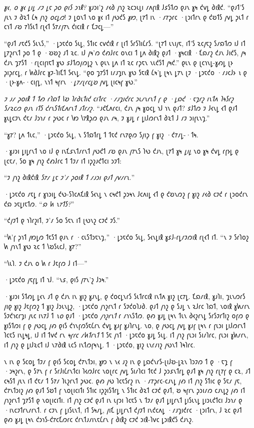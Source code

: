 \emph{𐑣𐑬, 𐑴 𐑣𐑬 𐑛𐑦𐑛 𐑥𐑲 𐑛𐑱 𐑜𐑴 𐑞𐑦𐑕 𐑮𐑪𐑙?} 𐑣𐑨𐑮𐑦'𐑟 𐑥𐑬𐑔 𐑢𐑪𐑟 𐑷𐑤𐑮𐑧𐑛𐑦 𐑥𐑵𐑝𐑦𐑙 𐑓𐑭𐑕𐑑𐑼 𐑞𐑨𐑯 𐑣𐑰 𐑒𐑫𐑛 𐑔𐑦𐑙𐑒. “𐑞𐑨𐑑'𐑕 𐑢𐑧𐑯 𐑲 𐑔𐑷𐑑 𐑖𐑰 𐑢𐑪𐑟 \emph{𐑴𐑤𐑛𐑼}! 𐑲 𐑛𐑴𐑯𐑑 𐑯𐑴 𐑣𐑬 𐑦𐑑 𐑢𐑻𐑒𐑕 \emph{𐑣𐑽}, 𐑚𐑳𐑑 𐑦𐑯 ·𐑥𐑳𐑜𐑩𐑤 ·𐑚𐑮𐑦𐑑𐑩𐑯 𐑞 𐑒𐑹𐑑𐑕 𐑢𐑫𐑛 𐑜𐑧𐑑 𐑩 𐑤𐑪𐑑 𐑥𐑹 𐑳𐑐𐑕𐑧𐑑 𐑩𐑚𐑬𐑑 𐑕𐑳𐑥𐑢𐑳𐑯 𐑒𐑦𐑤𐑦𐑙 𐑩 𐑗𐑲𐑤𐑛—”

“𐑞𐑨𐑑 𐑥𐑱𐑒𐑕 𐑕𐑧𐑯𐑕,” ·𐑛𐑮𐑱𐑒𐑴 𐑕𐑧𐑛, 𐑕𐑑𐑦𐑤 𐑤𐑫𐑒𐑦𐑙 𐑩 𐑚𐑦𐑑 𐑕𐑩𐑕𐑐𐑦𐑖𐑩𐑕. “𐑚𐑳𐑑 𐑧𐑯𐑦𐑢𐑱, 𐑦𐑑'𐑕 𐑷𐑤𐑢𐑱𐑟 𐑕𐑥𐑸𐑑𐑼 𐑦𐑓 𐑦𐑑 𐑛𐑳𐑟𐑩𐑯𐑑 𐑜𐑴 𐑑 𐑞 ·𐑹𐑹𐑟 𐑨𐑑 𐑷𐑤. 𐑦𐑓 𐑢𐑰'𐑼 𐑒𐑺𐑓𐑩𐑤 𐑴𐑯𐑤𐑦 𐑑 𐑛𐑵 𐑔𐑦𐑙𐑟 𐑞𐑨𐑑 ·𐑣𐑰𐑤𐑦𐑙 ·𐑗𐑸𐑥𐑟 𐑒𐑨𐑯 𐑓𐑦𐑒𐑕, 𐑢𐑰 𐑒𐑨𐑯 𐑡𐑳𐑕𐑑 ·𐑩𐑚𐑤𐑦𐑝𐑦𐑱𐑑 𐑣𐑻 𐑭𐑓𐑑𐑼𐑢𐑼𐑛𐑟 𐑯 𐑞𐑧𐑯 𐑛𐑵 𐑦𐑑 𐑷𐑤 𐑩𐑜𐑱𐑯 𐑯𐑧𐑒𐑕𐑑 𐑢𐑰𐑒.” 𐑞𐑧𐑯 𐑞 𐑚𐑤𐑪𐑯𐑛-𐑣𐑺𐑛 𐑚𐑶 𐑜𐑦𐑜𐑩𐑤𐑛, 𐑩 𐑿𐑔𐑓𐑩𐑤 𐑣𐑲-𐑐𐑦𐑗𐑑 𐑕𐑬𐑯𐑛. “𐑞𐑴 𐑡𐑳𐑕𐑑 𐑦𐑥𐑨𐑡𐑦𐑯 𐑣𐑻 𐑕𐑱𐑦𐑙 𐑖𐑰'𐑛 𐑚𐑰𐑯 𐑛𐑳𐑯 𐑚𐑲 ·𐑛𐑮𐑱𐑒𐑴 ·𐑥𐑨𐑤𐑓𐑶 \emph{𐑯} 𐑞 ·𐑚𐑶-𐑣𐑵-·𐑤𐑦𐑝𐑛, 𐑯𐑪𐑑 𐑰𐑝𐑩𐑯 \emph{·𐑛𐑳𐑥𐑚𐑩𐑤𐑛𐑹} 𐑢𐑫𐑛 𐑚𐑦𐑤𐑰𐑝 𐑣𐑻.”

\emph{𐑲 𐑨𐑥 𐑜𐑴𐑦𐑙 𐑑 𐑑𐑺 𐑩𐑐𐑸𐑑 𐑘𐑹 𐑐𐑩𐑔𐑧𐑑𐑦𐑒 𐑤𐑦𐑑𐑩𐑤 ·𐑥𐑨𐑡𐑦𐑒𐑩𐑤 𐑮𐑧𐑥𐑯𐑩𐑯𐑑 𐑝 𐑞 ·𐑛𐑸𐑒 ·𐑱𐑡𐑩𐑟 𐑦𐑯𐑑𐑵 𐑐𐑰𐑕𐑩𐑟 𐑕𐑥𐑷𐑤𐑼 𐑞𐑨𐑯 𐑦𐑑𐑕 𐑒𐑩𐑯𐑕𐑑𐑦𐑗𐑵𐑩𐑯𐑑 𐑨𐑑𐑩𐑥𐑟.} “𐑨𐑒𐑗𐑵𐑩𐑤𐑦, 𐑒𐑨𐑯 𐑢𐑰 𐑣𐑴𐑤𐑛 𐑪𐑓 𐑪𐑯 𐑞𐑨𐑑? 𐑭𐑓𐑑𐑼 𐑲 𐑓𐑬𐑯𐑛 𐑬𐑑 𐑞𐑨𐑑 𐑣𐑧𐑛𐑤𐑲𐑯 𐑒𐑱𐑥 𐑓𐑮𐑪𐑥 𐑩 𐑜𐑻𐑤 𐑩 𐑘𐑽 𐑘𐑳𐑙𐑜𐑼 𐑞𐑨𐑯 𐑥𐑰, 𐑲 𐑣𐑨𐑛 𐑩 𐑛𐑦𐑓𐑼𐑩𐑯𐑑 𐑔𐑷𐑑 𐑓 𐑥𐑲 𐑮𐑦𐑝𐑧𐑯𐑡.”

“𐑣𐑳? 𐑛𐑵 𐑑𐑧𐑤,” ·𐑛𐑮𐑱𐑒𐑴 𐑕𐑧𐑛, 𐑯 𐑕𐑑𐑸𐑑𐑩𐑛 𐑑 𐑑𐑱𐑒 𐑩𐑯𐑳𐑞𐑼 𐑕𐑢𐑦𐑜 𐑝 𐑣𐑦𐑟 ·𐑒𐑳𐑥𐑛-·𐑑𐑰.

·𐑣𐑨𐑮𐑦 𐑛𐑦𐑛𐑩𐑯𐑑 𐑯𐑴 𐑦𐑓 𐑞 𐑦𐑯𐑗𐑭𐑯𐑑𐑥𐑩𐑯𐑑 𐑢𐑻𐑒𐑑 𐑥𐑹 𐑞𐑨𐑯 𐑢𐑳𐑯𐑕 𐑐𐑻 𐑒𐑨𐑯, 𐑚𐑳𐑑 𐑣𐑰 \emph{𐑛𐑦𐑛} 𐑯𐑴 𐑣𐑰 𐑒𐑫𐑛 𐑩𐑝𐑶𐑛 𐑞 𐑚𐑤𐑱𐑥, 𐑕𐑴 𐑣𐑰 𐑢𐑪𐑟 𐑒𐑺𐑓𐑩𐑤 𐑑 𐑑𐑲𐑥 𐑦𐑑 𐑦𐑜𐑟𐑨𐑒𐑑𐑤𐑦 𐑮𐑲𐑑:

“𐑲 𐑢𐑪𐑟 𐑔𐑦𐑙𐑒𐑦𐑙 \emph{𐑕𐑳𐑥 𐑛𐑱 𐑲'𐑥 𐑜𐑴𐑦𐑙 𐑑 𐑥𐑨𐑮𐑦 𐑞𐑨𐑑 𐑢𐑫𐑥𐑩𐑯.}”

·𐑛𐑮𐑱𐑒𐑴 𐑥𐑱𐑛 𐑩 𐑣𐑪𐑮𐑦𐑛 𐑒𐑻-𐑕𐑐𐑤𐑵𐑗𐑦𐑙 𐑕𐑬𐑯𐑛 𐑯 𐑤𐑰𐑒𐑑 𐑜𐑮𐑰𐑯 𐑓𐑤𐑵𐑦𐑛 𐑬𐑑 𐑞 𐑒𐑹𐑯𐑼𐑟 𐑝 𐑣𐑦𐑟 𐑥𐑬𐑔 𐑤𐑲𐑒 𐑩 𐑚𐑮𐑴𐑒𐑩𐑯 𐑒𐑸 𐑮𐑱𐑛𐑦𐑱𐑑𐑼. “\emph{𐑸 𐑿 𐑯𐑳𐑑𐑕?}”

“𐑒𐑢𐑲𐑑 𐑞 𐑪𐑐𐑩𐑟𐑦𐑑, 𐑲'𐑥 𐑕𐑴 𐑕𐑱𐑯 𐑦𐑑 𐑚𐑻𐑯𐑟 𐑤𐑲𐑒 𐑲𐑕.”

“𐑿'𐑝 𐑜𐑪𐑑 𐑢𐑽𐑛𐑼 𐑑𐑱𐑕𐑑 𐑞𐑨𐑯 𐑩 ·𐑤𐑧𐑕𐑑𐑮𐑱𐑯𐑡,” ·𐑛𐑮𐑱𐑒𐑴 𐑕𐑧𐑛, 𐑕𐑬𐑯𐑛𐑦𐑙 𐑣𐑭𐑓-𐑩𐑛𐑥𐑲𐑼𐑦𐑙 𐑩𐑚𐑬𐑑 𐑦𐑑. “𐑯 𐑲 𐑕𐑩𐑐𐑴𐑟 𐑿 𐑢𐑪𐑯𐑑 𐑣𐑻 𐑷𐑤 𐑑 𐑘𐑹𐑕𐑧𐑤𐑓, 𐑣𐑳?”

“𐑘𐑧𐑐. 𐑲 𐑒𐑨𐑯 𐑴 𐑿 𐑩 𐑓𐑱𐑝𐑼 𐑓 𐑦𐑑—”

·𐑛𐑮𐑱𐑒𐑴 𐑢𐑱𐑝𐑛 𐑦𐑑 𐑪𐑓. “𐑯𐑭, 𐑞𐑦𐑕 𐑢𐑳𐑯'𐑟 𐑓𐑮𐑰.”

·𐑣𐑨𐑮𐑦 𐑕𐑑𐑺𐑛 𐑛𐑬𐑯 𐑨𐑑 𐑞 𐑒𐑨𐑯 𐑦𐑯 𐑣𐑦𐑟 𐑣𐑨𐑯𐑛, 𐑞 𐑒𐑴𐑤𐑛𐑯𐑩𐑕 𐑕𐑧𐑑𐑩𐑤𐑦𐑙 𐑦𐑯𐑑𐑵 𐑣𐑦𐑟 𐑚𐑤𐑳𐑛. 𐑗𐑸𐑥𐑦𐑙, 𐑣𐑨𐑐𐑦, 𐑡𐑧𐑯𐑼𐑩𐑕 𐑢𐑦𐑞 𐑣𐑦𐑟 𐑓𐑱𐑝𐑼𐑟 𐑑 𐑣𐑦𐑟 𐑓𐑮𐑧𐑯𐑛𐑟, ·𐑛𐑮𐑱𐑒𐑴 𐑢𐑪𐑟𐑩𐑯𐑑 𐑩 𐑕𐑲𐑒𐑴𐑐𐑨𐑔. 𐑞𐑨𐑑 𐑢𐑪𐑟 𐑞 𐑕𐑨𐑛 𐑯 𐑷𐑓𐑩𐑤 𐑐𐑸𐑑, 𐑯𐑴𐑦𐑙 𐑣𐑿𐑥𐑩𐑯 𐑕𐑲𐑒𐑪𐑤𐑩𐑡𐑦 𐑢𐑧𐑤 𐑦𐑯𐑳𐑓 𐑑 \emph{𐑯𐑴} 𐑞𐑨𐑑 ·𐑛𐑮𐑱𐑒𐑴 \emph{𐑢𐑪𐑟𐑩𐑯𐑑} 𐑩 𐑥𐑪𐑯𐑕𐑑𐑼. 𐑞𐑺 𐑣𐑨𐑛 𐑚𐑰𐑯 𐑑𐑧𐑯 𐑔𐑬𐑟𐑩𐑯𐑛 𐑕𐑩𐑕𐑲𐑩𐑑𐑦𐑟 𐑴𐑝𐑼 𐑞 𐑣𐑦𐑕𐑑𐑼𐑦 𐑝 𐑞 𐑢𐑻𐑤𐑛 𐑢𐑺 𐑞𐑦𐑕 𐑒𐑪𐑯𐑝𐑼𐑕𐑱𐑖𐑩𐑯 𐑒𐑫𐑛 𐑣𐑨𐑝 𐑣𐑨𐑐𐑩𐑯𐑛. 𐑯𐑴, 𐑞 𐑢𐑻𐑤𐑛 𐑢𐑫𐑛 𐑣𐑨𐑝 𐑚𐑰𐑯 𐑩 𐑝𐑧𐑮𐑦 𐑛𐑦𐑓𐑼𐑩𐑯𐑑 𐑐𐑤𐑱𐑕 𐑦𐑯𐑛𐑰𐑛, 𐑦𐑓 𐑦𐑑 𐑑𐑫𐑒 𐑩𐑯 \emph{𐑰𐑝𐑩𐑤 𐑥𐑿𐑑𐑩𐑯𐑑} 𐑑 𐑕𐑱 𐑢𐑪𐑑 ·𐑛𐑮𐑱𐑒𐑴 𐑣𐑨𐑛 𐑕𐑧𐑛. 𐑦𐑑 𐑢𐑪𐑟 𐑝𐑧𐑮𐑦 𐑕𐑦𐑥𐑐𐑩𐑤, 𐑝𐑧𐑮𐑦 𐑣𐑿𐑥𐑩𐑯, 𐑦𐑑 𐑢𐑪𐑟 𐑞 𐑛𐑦𐑓𐑷𐑤𐑑 𐑦𐑓 𐑯𐑳𐑔𐑦𐑙 𐑧𐑤𐑕 𐑦𐑯𐑑𐑼𐑝𐑰𐑯𐑛. 𐑑 ·𐑛𐑮𐑱𐑒𐑴, 𐑣𐑦𐑟 𐑧𐑯𐑩𐑥𐑦𐑟 𐑢𐑻𐑯𐑑 𐑐𐑰𐑐𐑩𐑤.

𐑯 𐑦𐑯 𐑞 𐑕𐑤𐑴𐑛 𐑑𐑲𐑥 𐑝 𐑞𐑦𐑕 𐑕𐑤𐑴𐑛 𐑒𐑳𐑯𐑑𐑮𐑦, 𐑣𐑽 𐑯 𐑯𐑬 𐑨𐑟 𐑦𐑯 𐑞 𐑛𐑸𐑒𐑯𐑩𐑕-𐑚𐑦𐑓𐑹-𐑛𐑷𐑯 𐑐𐑮𐑲𐑼 𐑑 𐑞 ·𐑱𐑡 𐑝 ·𐑮𐑰𐑟𐑩𐑯, 𐑞 𐑕𐑳𐑯 𐑝 𐑩 𐑕𐑩𐑓𐑦𐑖𐑩𐑯𐑑𐑤𐑦 𐑐𐑬𐑼𐑓𐑩𐑤 𐑯𐑴𐑚𐑩𐑤 𐑢𐑫𐑛 𐑕𐑦𐑥𐑐𐑤𐑦 𐑑𐑱𐑒 𐑓 𐑜𐑮𐑭𐑯𐑑𐑩𐑛 𐑞𐑨𐑑 𐑣𐑰 𐑢𐑪𐑟 𐑩𐑚𐑳𐑝 𐑞 𐑤𐑷, 𐑨𐑑 𐑤𐑰𐑕𐑑 𐑢𐑧𐑯 𐑦𐑑 𐑒𐑱𐑥 𐑑 𐑕𐑳𐑥 𐑐𐑧𐑟𐑩𐑯𐑑 𐑜𐑻𐑤. 𐑞𐑺 𐑢𐑻 𐑐𐑤𐑱𐑕𐑩𐑟 𐑦𐑯 ·𐑥𐑳𐑜𐑩𐑤-𐑤𐑨𐑯𐑛 𐑢𐑺 𐑦𐑑 𐑢𐑪𐑟 𐑕𐑑𐑦𐑤 𐑞 𐑕𐑱𐑥 𐑢𐑱, 𐑒𐑳𐑯𐑑𐑮𐑦𐑟 𐑢𐑺 𐑞𐑨𐑑 𐑕𐑹𐑑 𐑝 𐑯𐑴𐑚𐑦𐑤𐑦𐑑𐑦 𐑕𐑑𐑦𐑤 𐑦𐑜𐑟𐑦𐑕𐑑𐑩𐑛 𐑯 𐑕𐑑𐑦𐑤 𐑔𐑷𐑑 𐑤𐑲𐑒 𐑞𐑨𐑑, 𐑹 𐑰𐑝𐑩𐑯 𐑜𐑮𐑦𐑥𐑼 𐑤𐑨𐑯𐑛𐑟 𐑢𐑺 𐑦𐑑 𐑢𐑪𐑟𐑩𐑯𐑑 𐑡𐑳𐑕𐑑 𐑞 𐑯𐑴𐑚𐑦𐑤𐑦𐑑𐑦. 𐑦𐑑 𐑢𐑪𐑟 𐑤𐑲𐑒 𐑞𐑨𐑑 𐑦𐑯 𐑧𐑝𐑮𐑦 𐑐𐑤𐑱𐑕 𐑯 𐑑𐑲𐑥 𐑞𐑨𐑑 𐑛𐑦𐑛𐑩𐑯𐑑 𐑛𐑦𐑕𐑧𐑯𐑛 𐑛𐑦𐑮𐑧𐑒𐑑𐑤𐑦 𐑓𐑮𐑪𐑥 𐑞 ·𐑦𐑯𐑤𐑲𐑑𐑩𐑯𐑥𐑩𐑯𐑑. 𐑩 𐑤𐑲𐑯 𐑝 𐑛𐑦𐑕𐑧𐑯𐑑, 𐑦𐑑 𐑕𐑰𐑥𐑛, 𐑢𐑦𐑗 𐑛𐑦𐑛𐑩𐑯𐑑 𐑒𐑢𐑲𐑑 𐑦𐑯𐑒𐑤𐑵𐑛 ·𐑥𐑨𐑡𐑦𐑒𐑩𐑤 ·𐑚𐑮𐑦𐑑𐑩𐑯, 𐑓 𐑷𐑤 𐑞𐑨𐑑 𐑞𐑺 𐑣𐑨𐑛 𐑚𐑰𐑯 𐑒𐑮𐑪𐑕-𐑒𐑳𐑤𐑗𐑼𐑩𐑤 𐑒𐑩𐑯𐑑𐑨𐑥𐑦𐑯𐑱𐑖𐑩𐑯 𐑝 𐑔𐑦𐑙𐑟 𐑤𐑲𐑒 𐑮𐑦𐑙-𐑐𐑫𐑤 𐑛𐑮𐑦𐑙𐑒𐑕 𐑒𐑨𐑯𐑟.

